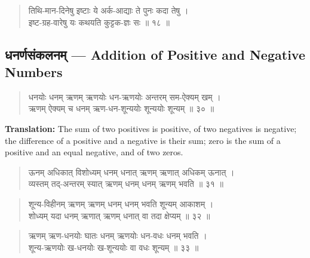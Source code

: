 \documentclass[11pt,a4paper]{article}
\newcommand{\dev}[1]{{\devanagarifont #1}}
\newenvironment{shloka}{\begin{verse}\devanagarifont\large}{\end{verse}}
\begin{document}
\vspace{0.3cm}

\begin{shloka}
तिथि-मान-दिनेषु इष्टाः ये अर्क-आद्याः ते पुनः कदा तेषु ।\\
इष्ट-ग्रह-वारेषु यः कथयति कुट्टक-ज्ञः सः ॥ १८ ॥
\end{shloka}

\newpage

\subsection*{\dev{धनर्णसंकलनम् — Addition of Positive and Negative Numbers}}

\begin{shloka}
धनयोः धनम् ऋणम् ऋणयोः धन-ऋणयोः अन्तरम् सम-ऐक्यम् खम् ।\\
ऋणम् ऐक्यम् च धनम् ऋण-धन-शून्ययोः शून्ययोः शून्यम् ॥ ३० ॥
\end{shloka}

\textbf{Translation:}\quad
The sum of two positives is positive, of two negatives is negative; the
difference of a positive and a negative is their sum; zero is the sum
of a positive and an equal negative, and of two zeros.

\vspace{0.3cm}

\begin{shloka}
ऊनम् अधिकात् विशोध्यम् धनम् धनात् ऋणम् ऋणात् अधिकम् ऊनात् ।\\
व्यस्तम् तद्-अन्तरम् स्यात् ऋणम् धनम् धनम् ऋणम् भवति ॥ ३१ ॥
\end{shloka}

\vspace{0.3cm}

\begin{shloka}
शून्य-विहीनम् ऋणम् ऋणम् धनम् धनम् भवति शून्यम् आकाशम् ।\\
शोध्यम् यदा धनम् ऋणात् ऋणम् धनात् वा तदा क्षेप्यम् ॥ ३२ ॥
\end{shloka}

\vspace{0.3cm}

\begin{shloka}
ऋणम् ऋण-धनयोः घातः धनम् ऋणयोः धन-वधः धनम् भवति ।\\
शून्य-ऋणयोः ख-धनयोः ख-शून्ययोः वा वधः शून्यम् ॥ ३३ ॥
\end{shloka}
\end{document}
